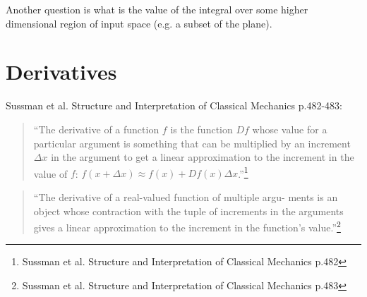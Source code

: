 Another question is what is the value of the integral over some higher
dimensional region of input space (e.g. a subset of the plane).


\section{Derivatives}

Sussman et al. Structure and Interpretation of Classical Mechanics p.482-483:

\begin{quote}
  ``The derivative of a function $f$ is the function $D f$ whose value
  for a particular argument is something that can be multiplied by an
  increment $\Delta x$ in the argument to get a linear approximation to the
  increment in the value of $f$:
  $f(x + \Delta x) \approx f(x) + D f(x) \Delta x$.''\footnote{Sussman et
    al. Structure and Interpretation of Classical Mechanics p.482}
\end{quote}

\begin{quote}
  ``The derivative of a real-valued function of multiple argu- ments
  is an object whose contraction with the tuple of increments in the
  arguments gives a linear approximation to the increment in the
  function’s value.''\footnote{Sussman et al. Structure and
    Interpretation of Classical Mechanics p.483}
\end{quote}


